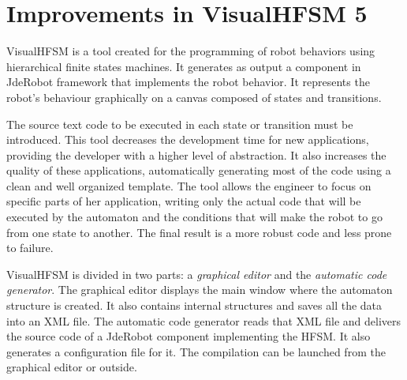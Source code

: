 \documentclass[journal,twoside]{JoPhA}
\begin{document}
\section{Improvements in VisualHFSM 5}
VisualHFSM \cite{borja2013} is a tool created for the programming of robot behaviors using hierarchical finite states machines. It generates as output a component in JdeRobot framework that implements the robot behavior. It represents the robot’s behaviour graphically on a canvas composed of states and transitions. 

The source text code to be executed in each state or transition must be introduced. This tool decreases the development time for new applications, providing the developer with a higher level of abstraction. It also increases the quality of these applications, automatically generating most of the code using a clean and well organized template. The tool allows the engineer to focus on specific parts of her application, writing only the actual code that will be executed by the automaton and the conditions that will make the robot to go from one state to another. The final result is a more robust code and less prone to failure. 


VisualHFSM is divided in two parts: a \textit{graphical editor} and the \textit{automatic code generator}. The graphical editor displays the main window where the automaton structure is created. It also contains internal structures and saves all the data into an XML file. %
The automatic code generator reads that XML file 
and delivers the source code of a JdeRobot component implementing the HFSM. It also generates a configuration file for it. The compilation can be launched from the graphical editor or outside.

\end{document}
